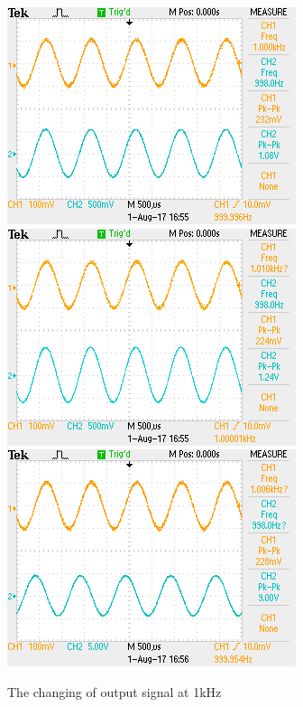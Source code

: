 \begin{figure}[!htbp]
	\centering
	\begin{framed}
		\includegraphics[width=\linewidth]{images/TEK0003.png}
		\includegraphics[width=\linewidth]{images/TEK0004.png}
		\includegraphics[width=\linewidth]{images/TEK0005.png}
		\caption{The changing of output signal at 1kHz}
		\label{fig:wave1k}
	\end{framed}
\end{figure}

